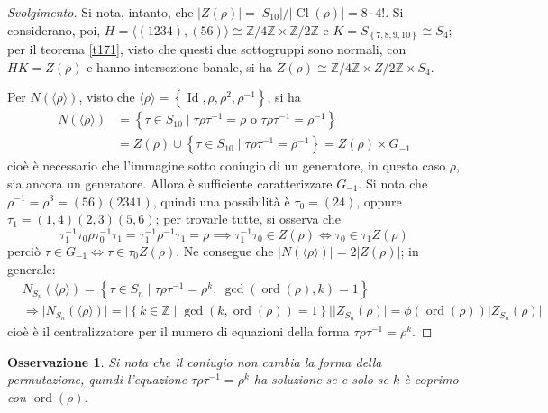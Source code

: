 \documentclass[12pt]{scrartcl}
\theoremstyle{style}
\newtheorem{osservazione}{Osservazione}[section]
\newenvironment{svolgimento}{\renewcommand\qedsymbol{$\blacksquare$}\begin{proof}[Svolgimento]}{\end{proof}}
\numberwithin{equation}{subsection}
\begin{document}
\begin{svolgimento}
	Si nota, intanto, che $\lvert Z(\rho ) \rvert = \lvert S_{10} \rvert / \lvert \operatorname{Cl} (\rho ) \rvert = 8 \cdot 4!$.
	Si considerano, poi, $H = \langle (1234),(56) \rangle\cong \mathbb{Z}/4\mathbb{Z} \times \mathbb{Z}/2\mathbb{Z}$ e $K = S_{\left\{ 7,8,9,10 \right\} } \cong S_4$; per il teorema \ref{t171}, visto che questi due sottogruppi sono normali, con $HK = Z(\rho )$ e hanno intersezione banale, si ha $Z(\rho ) \cong \mathbb{Z}/4\mathbb{Z} \times Z / 2\mathbb{Z} \times S_4$.

	Per $N(\langle \rho  \rangle)$, visto che $\langle \rho  \rangle=\left\{ \operatorname{Id} , \rho ,\rho ^2, \rho ^{-1} \right\} $, si ha
	\[
		\begin{split}
			N(\langle \rho  \rangle) &= \left\{ \tau  \in S_{10}  \mid  \tau \rho \tau ^{-1}= \rho  \text{ o } \tau \rho \tau ^{-1}=\rho ^{-1}\right\} \\
						 &= Z(\rho )\cup \left\{ \tau \in S_{10}  \mid \tau \rho \tau ^{-1}=\rho ^{-1}\right\} = Z(\rho) \times G_{-1}
		\end{split}
	\] 
	cio\`e \`e necessario che l'immagine sotto coniugio di un generatore, in questo caso $\rho $, sia ancora un generatore.
	Allora \`e sufficiente caratterizzare $G_{-1} $.
	Si nota che $\rho ^{-1}= \rho ^{3}= (56)(2341)$, quindi una possibilit\`a \`e $\tau_0 = (24)$, oppure $\tau_1= (1,4)(2,3)(5,6)$; per trovarle tutte, si osserva che
	\[
	\tau _1^{-1}\tau _0 \rho \tau_0 ^{-1}\tau _1 = \tau _1^{-1}\rho ^{-1}\tau _1= \rho \implies \tau _1^{-1}\tau _0 \in Z(\rho ) \iff \tau _0 \in \tau _1 Z(\rho )
	\] 
	perci\`o $\tau \in G_{-1} \iff \tau \in \tau _0 Z(\rho )$. 
	Ne consegue che $\lvert N(\langle \rho  \rangle) \rvert = 2 \lvert Z(\rho ) \rvert $; in generale:
	\begin{equation*}
		\begin{split}
			&N_{S_n} (\langle \rho  \rangle) = \left\{ \tau  \in S_n  \mid \tau \rho \tau ^{-1}=\rho ^{k}, \ \operatorname{gcd}(\operatorname{ord}(\rho ) ,k) =1 \right\} \\
			&\Rightarrow \lvert N_{S_n} (\langle \rho \rangle ) \rvert = \lvert \left\{ k \in \mathbb{Z} \mid \operatorname{gcd}(k,\operatorname{ord}(\rho ) ) =1 \right\}  \rvert \lvert Z_{S_n} (\rho ) \rvert =\phi (\operatorname{ord}(\rho ) ) \lvert Z_{S_n} (\rho ) \rvert 
		\end{split}
	\end{equation*}
	cio\`e \`e il centralizzatore per il numero di equazioni della forma $\tau \rho \tau ^{-1}= \rho ^k$.
\end{svolgimento}
\begin{osservazione}
	Si nota che il coniugio non cambia la forma della permutazione, quindi l'equazione $\tau \rho \tau ^{-1} = \rho ^k$ ha soluzione se e solo se $k$ \`e coprimo con $\operatorname{ord}(\rho ) $.
\end{osservazione}
\end{document}

